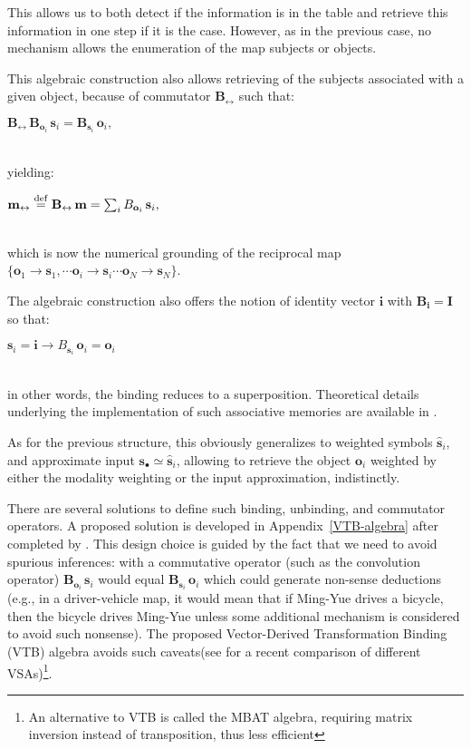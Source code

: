 \documentclass[sn-mathphys]{sn-jnl}
\newcommand{\defq}{\stackrel {\rm def}{=}}
\newcommand{\eqline}[1]{~\vspace{0.1cm}\\\centerline{$#1$}\vspace{0.1cm}\\}
\begin{document}
\begin{appendices}
This allows us to both detect if the information is in the table and retrieve this information in one step if it is the case. However, as in the previous case, no mechanism allows the enumeration of the map subjects or objects.

This algebraic construction also allows retrieving of the subjects associated with a given object, because of commutator $\mathbf{B_{\leftrightarrow}}$ such that:
\eqline{\mathbf{B_{\leftrightarrow}} \, \mathbf{B}_{\mathbf{o}_i} \, \mathbf{s}_i = \mathbf{B}_{\mathbf{s}_i} \, \mathbf{o}_i,}
yielding:
\eqline{\mathbf{m_{\leftrightarrow}} \defq \mathbf{B_{\leftrightarrow}} \, \mathbf{m} = \sum_i B_{\mathbf{o}_i} \, \mathbf{s}_i,}
which is now the numerical grounding of the reciprocal map $\{\mathbf{o}_1 \rightarrow \mathbf{s}_1, \cdots \mathbf{o}_i \rightarrow \mathbf{s}_i \cdots \mathbf{o}_N \rightarrow \mathbf{s}_N\}$.

The algebraic construction also offers the notion of identity vector $\mathbf{i}$ with $\mathbf{B_{\mathbf{i}}} = \mathbf{I}$ so that:
\eqline{\mathbf{s}_i = \mathbf{i} \rightarrow B_{\mathbf{s}_i} \, \mathbf{o}_i = \mathbf{o}_i}
in other words, the binding reduces to a superposition. Theoretical details underlying the implementation of such associative memories are available in \cite{stewart_biologically_2011}.

As for the previous structure, this obviously generalizes to weighted symbols $\hat{\mathbf{s}}_i$, and approximate input
$\mathbf{s}_\bullet \simeq \hat{\mathbf{s}}_i$, allowing to retrieve the object $\mathbf{o}_i$ weighted by either the modality weighting or the input approximation, indistinctly.

There are several solutions to define such binding, unbinding, and commutator operators. A proposed solution is developed in Appendix~\ref{VTB-algebra} after \cite{gosmann_vector-derived_2019} completed by \cite{mercier_ontology_2021}. This design choice is guided by the fact that we need to avoid spurious inferences: with a commutative operator (such as the convolution operator) $\mathbf{B}_{\mathbf{o}_i} \, \mathbf{s}_i$ would equal $\mathbf{B}_{\mathbf{s}_i} \, \mathbf{o}_i$ which could generate non-sense deductions (e.g., in a driver-vehicle map, it would mean that if Ming-Yue drives a bicycle, then the bicycle drives Ming-Yue unless some additional mechanism is considered to avoid such nonsense). The proposed Vector-Derived Transformation Binding (VTB) algebra avoids such caveats(see \cite{schlegel_comparison_2020} for a recent comparison of different VSAs)\footnote{An alternative to VTB is called the MBAT algebra, requiring matrix inversion instead of transposition, thus less efficient}. 


\end{appendices}
\end{document}

